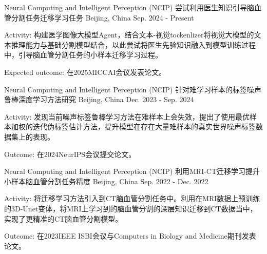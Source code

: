 

\begin{cventries}

  \cventry
  {Neural Computing and Intelligent Perception (NCIP)}
  {尝试利用医生知识引导脑血管分割任务迁移学习任务}
  {Beijing, China}
  {Sep. 2024 - Present}
  {
    \begin{cvitems}
      \item {Activity: 构建医学图像大模型Agent，结合文本-视觉tockenlizer将视觉大模型的文本推理能力与基础分割模型结合，以此尝试将医生先验知识融入到模型训练过程中，引导脑血管分割任务的小样本迁移学习过程。}
      \item {Expected outcome: 在2025MICCAI会议发表论文。}
    \end{cvitems}
  }

  \cventry
  {Neural Computing and Intelligent Perception (NCIP)}
  {针对难学习样本的标签噪声鲁棒深度学习方法研究}
  {Beijing, China}
  {Dec. 2023 - Sep. 2024}
  {
    \begin{cvitems}
      \item {Activity: 发现当前噪声标签鲁棒学习方法在难样本上会失效，提出了使用最优样本加权的迭代伪标签估计方法，提升模型在存在大量难样本的真实世界噪声标签数据集上的表现。}
      \item {Outcome: 在2024NeurIPS会议提交论文。}
    \end{cvitems}
  }

  \cventry
  {Neural Computing and Intelligent Perception (NCIP)}
  {利用MRI-CT迁移学习提升小样本脑血管分割任务精度}
  {Beijing, China}
  {Sep. 2022 - Dec. 2022}
  {
    \begin{cvitems}
      \item {Activity: 将迁移学习方法引入到CT脑血管分割任务中。利用在MRI数据上预训练的3D-Unet变体，将MRI上学习到的脑血管分割的深层知识迁移到CT数据当中，实现了更精准的CT脑血管分割模型。}
      \item {Outcome: 在2023IEEE ISBI会议与Computers in Biology and Medicine期刊发表论文。}
    \end{cvitems}
  }


\end{cventries}
